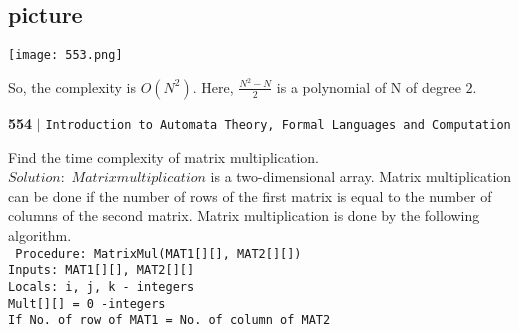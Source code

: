 \documentclass[12pt]{article}
\begin{document}
\begin{center}
\section{picture}
\texttt{[image: 553.png]}
\end{center}

So, the complexity is $O(N^{2})$. Here, $ \frac{N^{2} - N}{2}$ is a polynomial of N of degree $2$.\\

\newpage
\begin{flushleft}
    \textbf{554}\hspace*{0.1cm} \textbf{$|$} \hspace*{0.1cm} \texttt{Introduction to Automata Theory, Formal Languages and Computation}
  \end{flushleft}

\vspace*{0.5cm}
\hspace*{0.1cm} Find the time complexity of matrix multiplication.\\

\textbf{$Solution:$} $Matrix multiplication$ is a two-dimensional array. Matrix multiplication can be done if the
number of rows of the first matrix is equal to the number of columns of the second matrix. Matrix
multiplication is done by the following algorithm.\\

\texttt{
\hspace*{1.5cm} Procedure: MatrixMul(MAT1[][], MAT2[][])\\
\hspace*{1.5cm} Inputs: MAT1[][], MAT2[][] \\
\hspace*{2cm} Locals: i, j, k - integers \\
\hspace*{2cm} Mult[][] = 0 -integers \\
\hspace*{2cm} If No. of row of MAT1 = No. of column of MAT2 \\
}
\end{document}
